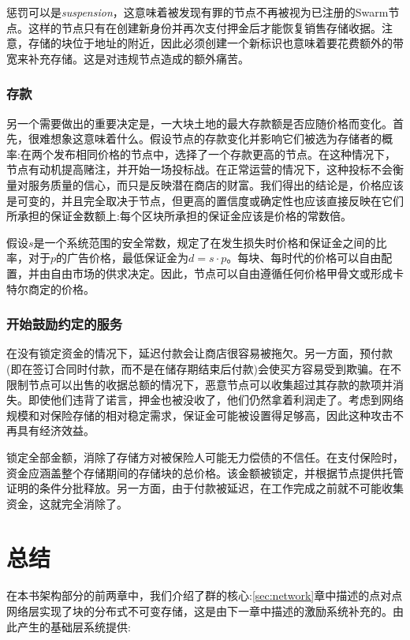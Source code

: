 惩罚可以是\emph{suspension}，这意味着被发现有罪的节点不再被视为已注册的Swarm节点。这样的节点只有在创建新身份并再次支付押金后才能恢复销售存储收据。注意，存储的块位于地址的附近，因此必须创建一个新标识也意味着要花费额外的带宽来补充存储。这是对违规节点造成的额外痛苦。


\subsubsection{存款}

另一个需要做出的重要决定是，一大块土地的最大存款额是否应随价格而变化。首先，很难想象这意味着什么。假设节点的存款变化并影响它们被选为存储者的概率:在两个发布相同价格的节点中，选择了一个存款更高的节点。在这种情况下，节点有动机提高赌注，并开始一场投标战。在正常运营的情况下，这种投标不会衡量对服务质量的信心，而只是反映潜在商店的财富。我们得出的结论是，价格应该是可变的，并且完全取决于节点，但更高的置信度或确定性也应该直接反映在它们所承担的保证金数额上:每个区块所承担的保证金应该是价格的常数倍。

假设$s$是一个系统范围的安全常数，规定了在发生损失时价格和保证金之间的比率，对于$p$的广告价格，最低保证金为$d=s\cdot p$。每块、每时代的价格可以自由配置，并由自由市场的供求决定。因此，节点可以自由遵循任何价格甲骨文或形成卡特尔商定的价格。

\subsubsection{开始鼓励约定的服务}

在没有锁定资金的情况下，延迟付款会让商店很容易被拖欠。另一方面，预付款(即在签订合同时付款，而不是在储存期结束后付款)会使买方容易受到欺骗。在不限制节点可以出售的收据总额的情况下，恶意节点可以收集超过其存款的款项并消失。即使他们违背了诺言，押金也被没收了，他们仍然拿着利润走了。考虑到网络规模和对保险存储的相对稳定需求，保证金可能被设置得足够高，因此这种攻击不再具有经济效益。

锁定全部金额，消除了存储方对被保险人可能无力偿债的不信任。在支付保险时，资金应涵盖整个存储期间的存储块的总价格。该金额被锁定，并根据节点提供托管证明的条件分批释放。另一方面，由于付款被延迟，在工作完成之前就不可能收集资金，这就完全消除了。

\section{总结}


在本书架构部分的前两章中，我们介绍了群的核心:\ref{sec:network}章中描述的点对点网络层实现了块的分布式不可变存储，这是由下一章中描述的激励系统补充的。由此产生的基础层系统提供:

